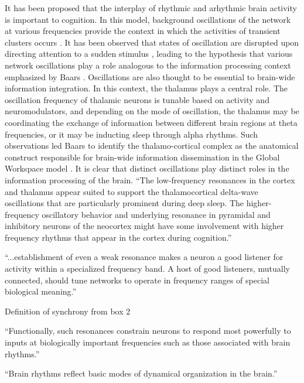 It has been proposed that the interplay of rhythmic and arhythmic brain activity is important to cognition. In this model, background oscillations of the network at various frequencies provide the context in which the activities of transient clusters occurs \cite{ll1988,others}. It has been observed that states of oscillation are disrupted upon directing attention to a sudden stimulus \cite{bu2006}, leading to the hypothesis that various network oscillations play a role analogous to the information processing context emphasized by Baars \cite{ba1988}. Oscillations are also thought to be essential to brain-wide information integration. In this context, the thalamus plays a central role. The oscillation frequency of thalamic neurons is tunable based on activity and neuromodulators, and depending on the mode of oscillation, the thalamus may be coordinating the exchange of information between different brain regions at theta frequencies, or it may be inducting sleep through alpha rhythms. Such observations led Baars to identify the thalamo-cortical complex as the anatomical construct responsible for brain-wide information dissemination in the Global Workspace model \cite{ba1988}. It is clear that distinct oscillations play distinct roles in the information processing of the brain. ``The low-frequency resonances in the cortex and thalamus appear suited to support the thalamocortical delta-wave oscillations that are particularly prominent during deep sleep. The higher-frequency oscillatory behavior and underlying resonance in pyramidal and inhibitory neurons of the neocortex might have some involvement with higher frequency rhythms that appear in the cortex during cognition.'' \cite{huya2000}

\vspace{3em}
``...establishment of even a weak resonance makes a neuron a good listener for activity within a specialized frequency band. A host of good listeners, mutually connected, should tune networks to operate in frequency ranges of special biological meaning.'' \cite{huya2000}

\vspace{3em}
Definition of synchrony from \cite{vala2001} box 2

\vspace{3em}
``Functionally, such resonances constrain neurons to respond most powerfully to inputs at biologically important frequencies such as those associated with brain rhythms.'' \cite{huya2000}

\vspace{3em}
``Brain rhythms reflect basic modes of dynamical organization in the brain.'' \cite{huya2000}

